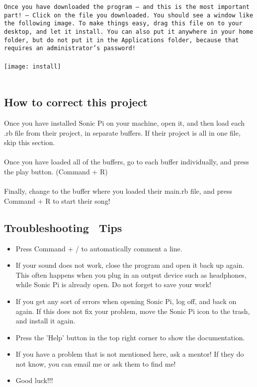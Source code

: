 \documentclass{42-en}
\begin{document}
		\newpage
		\texttt{Once you have downloaded the program -- and this is the most important part! -- Click on the file you downloaded. You should see a window like the following image.  To make things easy, drag this file on to your desktop, and let it install. You can also put it anywhere in your home folder, but do not put it in the Applications folder, because that requires an administrator's password!}\\\\
		\texttt{[image: install]}\\\\
	\newpage

	\subsection{How to correct this project}
		Once you have installed Sonic Pi on your machine, open it, and then load each .rb file from their project, in separate buffers. If their project is all in one file, skip this section.\\\\
		Once you have loaded all of the buffers, go to each buffer individually, and press the play button. (Command + R)\\\\
		Finally, change to the buffer where you loaded their main.rb file, and press Command + R to start their song!
	\newpage

	\subsection{Troubleshooting \ Tips}
	\begin{itemize}\itemsep1pt
		\item Press Command + / to automatically comment a line.
		\item If your sound does not work, close the program and open it back up again. This often happens when you plug in an output device such as headphones, while Sonic Pi is already open. Do not forget to save your work!
		\item If you get any sort of errors when opening Sonic Pi, log off, and back on again. If this does not fix your problem, move the Sonic Pi icon to the trash, and install it again.
		\item Press the 'Help' button in the top right corner to show the documentation.
		\item If you have a problem that is not mentioned here, ask a mentor! If they do not know, you can email me or ask them to find me!
		\item Good luck!!!
		\end{itemize}
\end{document}

